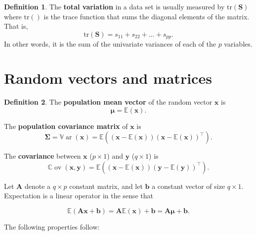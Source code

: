 \documentclass[
]{book}
\theoremstyle{definition}
\newtheorem{definition}{Definition}[chapter]
\theoremstyle{definition}
\theoremstyle{definition}
\theoremstyle{definition}
\theoremstyle{remark}
\begin{document}
\begin{definition}
\protect\hypertarget{def:totalvar}{}\label{def:totalvar}The \textbf{total variation} in a data set is usually measured by \(\text{tr}(\mathbf S)\) where \(\text{tr}()\) is the trace function that sums the diagonal elements of the matrix. That is,
\[\text{tr}(\mathbf S) = s_{11} + s_{22} + \ldots + s_{pp}.\]
In other words, it is the sum of the univariate variances of each of the \(p\) variables.
\end{definition}

\section{Random vectors and matrices}\label{randvec}

\begin{definition}
\protect\hypertarget{def:popmean}{}\label{def:popmean}The \textbf{population mean vector} of the random vector \(\mathbf x\) is
\[{\boldsymbol{\mu}}= {\mathbb{E}}(\mathbf x).\]

The \textbf{population covariance matrix} of \(\mathbf x\) is
\[ \boldsymbol{\Sigma}= {\mathbb{V}\operatorname{ar}}(\mathbf x) = {\mathbb{E}}\left((\mathbf x-{\mathbb{E}}(\mathbf x))(\mathbf x-{\mathbb{E}}(\mathbf x))^\top \right).\]

The \textbf{covariance} between \(\mathbf x\) (\(p \times 1\)) and \(\mathbf y\) (\(q \times 1\)) is
\[ {\mathbb{C}\operatorname{ov}}(\mathbf x,\mathbf y) = {\mathbb{E}}\left((\mathbf x- {\mathbb{E}}(\mathbf x))(\mathbf y- {\mathbb{E}}(\mathbf y))^\top \right). \]
\end{definition}

Let \(\mathbf A\) denote a \(q \times p\) constant matrix, and let \(\mathbf b\) a constant vector of size \(q \times 1\).
Expectation is a linear operator in the sense that

\[{\mathbb{E}}(\mathbf A\mathbf x+ \mathbf b) = \mathbf A{\mathbb{E}}(\mathbf x) + \mathbf b=\mathbf A{\boldsymbol{\mu}}+\mathbf b.\]

The following properties follow:
\end{document}
